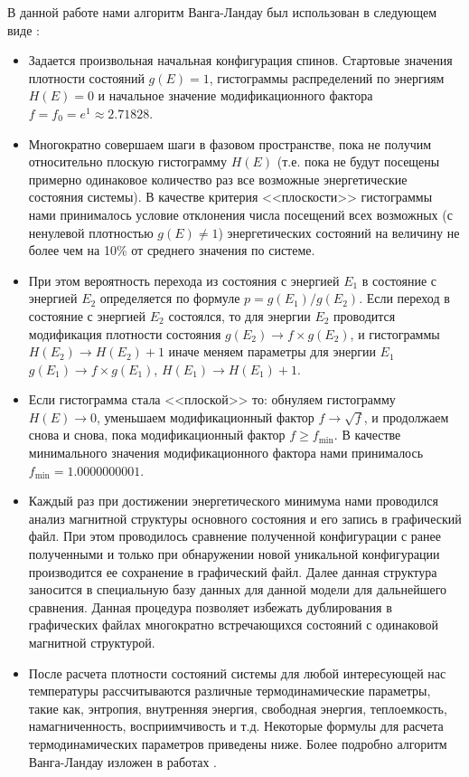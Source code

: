 В данной работе нами алгоритм Ванга-Ландау был использован в следующем виде \cite{mma-bib-10, mma-bib-11, mma-bib-12}:
\begin{itemize}
    \item Задается произвольная начальная конфигурация спинов. Стартовые значения плотности состояний $g(E) = 1$, гистограммы распределений по энергиям $H(E) = 0$ и начальное значение модификационного фактора $f = f_0 = e^1 \approx 2.71828$.
    \item Многократно совершаем шаги в фазовом пространстве, пока не получим относительно плоскую гистограмму $H(E)$ (т.е. пока не будут посещены примерно одинаковое количество раз все возможные энергетические состояния системы). В качестве критерия <<плоскости>> гистограммы нами принималось условие отклонения числа посещений всех возможных (с ненулевой плотностью $g(E) \neq 1$) энергетических состояний на величину не более чем на 10\% от среднего значения по системе.
    \item При этом вероятность перехода из состояния с энергией $E_1$ в состояние с энергией $E_2$ определяется по формуле $p = g(E_1)/g(E_2)$. Если переход в состояние с энергией $E_2$ состоялся, то для энергии $E_2$ проводится модификация плотности состояния $g(E_2) \to f \times g(E_2)$, и гистограммы $H(E_2) \to H(E_2) + 1$ иначе меняем параметры для энергии $E_1$ $g(E_1) \to f \times g(E_1)$, $H(E_1) \to H(E_1) + 1$.
    \item Если гистограмма стала <<плоской>> то: обнуляем гистограмму $H(E) \to 0$,  уменьшаем модификационный фактор $f \to \sqrt{f}$, и продолжаем снова и снова, пока модификационный фактор $f \geq f_{\min}$. В качестве минимального значения модификационного фактора нами принималось $f_{\min} = 1.0000000001$.
    \item Каждый раз при достижении энергетического минимума нами проводился анализ магнитной структуры основного состояния и его запись в графический файл. При этом проводилось сравнение полученной конфигурации с ранее полученными и только при обнаружении новой уникальной конфигурации производится ее сохранение в графический файл. Далее данная структура заносится в специальную базу данных для данной модели для дальнейшего сравнения. Данная процедура позволяет избежать дублирования в графических файлах многократно встречающихся состояний с одинаковой магнитной структурой.
    \item После расчета плотности состояний системы для любой интересующей нас температуры рассчитываются различные термодинамические параметры, такие как, энтропия, внутренняя энергия, свободная энергия, теплоемкость, намагниченность, восприимчивость и т.д. Некоторые формулы для расчета термодинамических параметров приведены ниже.
    Более подробно алгоритм Ванга-Ландау изложен в работах \cite{mma-bib-10, mma-bib-11, mma-bib-12, mma-bib-13, mma-bib-14, mma-bib-15}.
\end{itemize}

